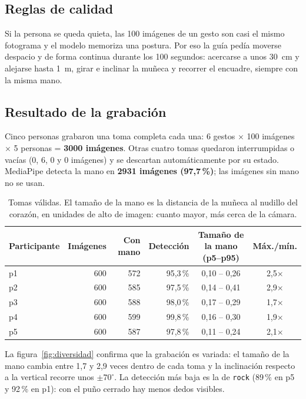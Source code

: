 \documentclass[11pt,a4paper]{article}
\newcommand{\pct}[1]{#1\,\%}
\newcommand{\codigo}[1]{\texttt{#1}}
\begin{document}
\subsection{Reglas de calidad}

Si la persona se queda quieta, las 100 imágenes de un gesto son casi el mismo fotograma y el modelo memoriza una
postura. Por eso la guía pedía moverse despacio y de forma continua durante los 100 segundos: acercarse a unos 30~cm
y alejarse hasta 1~m, girar e inclinar la muñeca y recorrer el encuadre, siempre con la misma mano.

\subsection{Resultado de la grabación}

Cinco personas grabaron una toma completa cada una: 6 gestos $\times$ 100 imágenes $\times$ 5 personas =
\textbf{\num{3000} imágenes}. Otras cuatro tomas quedaron interrumpidas o vacías (0, 6, 0 y 0 imágenes) y se descartan
automáticamente por su estado. MediaPipe detecta la mano en \textbf{\num{2931} imágenes (\pct{97,7})}; las imágenes
sin mano no se usan.

\begin{table}[H]
\centering\small
\begin{tabular}{lrrrcc}
\toprule
Participante & Imágenes & Con mano & Detección & Tamaño de la mano (p5--p95) & Máx./mín. \\
\midrule
p1 & 600 & 572 & \pct{95,3} & 0,10 -- 0,26 & 2,5$\times$ \\
p2 & 600 & 585 & \pct{97,5} & 0,14 -- 0,41 & 2,9$\times$ \\
p3 & 600 & 588 & \pct{98,0} & 0,17 -- 0,29 & 1,7$\times$ \\
p4 & 600 & 599 & \pct{99,8} & 0,16 -- 0,30 & 1,9$\times$ \\
p5 & 600 & 587 & \pct{97,8} & 0,11 -- 0,24 & 2,1$\times$ \\
\bottomrule
\end{tabular}
\caption{Tomas válidas. El tamaño de la mano es la distancia de la muñeca al nudillo del corazón, en unidades de alto
de imagen: cuanto mayor, más cerca de la cámara.}
\label{tab:dataset}
\end{table}

La figura~\ref{fig:diversidad} confirma que la grabación es variada: el tamaño de la mano cambia entre 1,7 y 2,9 veces
dentro de cada toma y la inclinación respecto a la vertical recorre unos $\pm 70^\circ$. La detección más baja es la de
\codigo{rock} (\pct{89} en p5 y \pct{92} en p1): con el puño cerrado hay menos dedos visibles.
\end{document}
